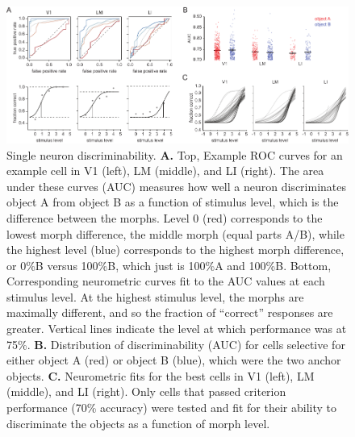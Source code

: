 \begin{figure}[t!]
    \includegraphics[width=\textwidth]{figures/chapter_4/fig_4-3_neurometric/fig_4-3_neurometric.pdf}
    \caption[Single neuron discriminability]{Single neuron discriminability. 
    \textbf{A.} Top, Example ROC curves for an example cell in V1 (left), LM (middle), and LI (right). The area under these curves (AUC) measures how well a neuron discriminates object A from object B as a function of stimulus level, which is the difference between the morphs. Level 0 (red) corresponds to the lowest morph difference, the middle morph (equal parts A/B), while the highest level (blue) corresponds to the highest morph difference, or 0\%B versus 100\%B, which just is 100\%A and 100\%B. Bottom, Corresponding neurometric curves fit to the AUC values at each stimulus level. At the highest stimulus level, the morphs are maximally different, and so the fraction of ``correct'' responses are greater. Vertical lines indicate the level at which performance was at 75\%.
    \textbf{B.} Distribution of discriminability (AUC) for cells selective for either object A (red) or object B (blue), which were the two anchor objects.
    \textbf{C.} Neurometric fits for the best cells in V1 (left), LM (middle), and LI (right). Only cells that passed criterion performance (70\% accuracy) were tested and fit for their ability to discriminate the objects as a function of morph level.
    \label{fig:neurometric}}
\end{figure}



